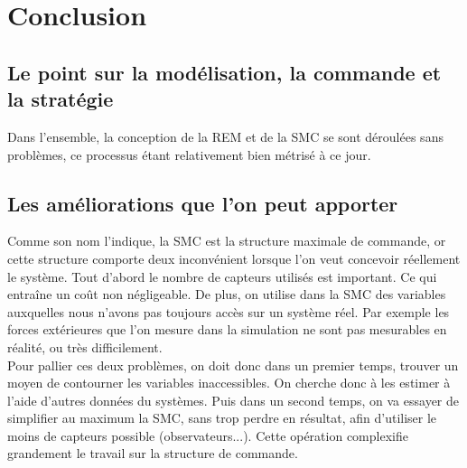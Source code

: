 \section{Conclusion}

\subsection{Le point sur la modélisation, la commande et la stratégie}

Dans l'ensemble, la conception de la REM et de la SMC se sont déroulées sans problèmes, ce processus étant relativement bien métrisé à ce jour. %


\subsection{Les améliorations que l'on peut apporter}

Comme son nom l'indique, la SMC est la structure maximale de commande, or cette structure comporte deux inconvénient lorsque l'on veut concevoir réellement le système. Tout d'abord le nombre de capteurs utilisés est important. Ce qui entraîne un coût non négligeable. De plus, on utilise dans la SMC des variables auxquelles nous n'avons pas toujours accès sur un système réel. Par exemple les forces extérieures que l'on mesure dans la simulation ne sont pas mesurables en réalité, ou très difficilement. \\

Pour pallier ces deux problèmes, on doit donc dans un premier temps, trouver un moyen de contourner les variables inaccessibles. On cherche donc à les estimer à l'aide d'autres données du systèmes. Puis dans un second temps, on va essayer de simplifier au maximum la SMC, sans trop perdre en résultat, afin d'utiliser le moins de capteurs possible (observateurs...). Cette opération complexifie grandement le travail sur la structure de commande. 